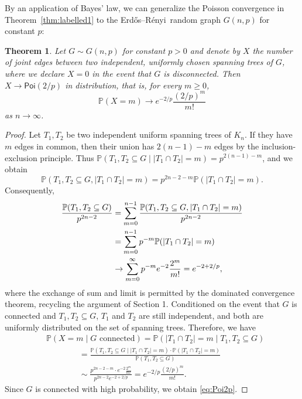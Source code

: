 \documentclass[a4paper,12pt,reqno]{amsart}
\newtheorem{theorem}[lemma]{Theorem}
\theoremstyle{remark}
\newcommand{\IP}{\mathbb{P}}
\newcommand{\Poi}{\mathsf{Poi}}
\newcommand{\ER}{Erd\H{o}s--R\'enyi\ }
\newcommand{\ssq}{\subseteq}
\begin{document}
By an application of Bayes' law, we can generalize the Poisson convergence in Theorem~\ref{thm:labelled1} to the \ER random graph $G(n,p)$ for constant $p$:
\begin{theorem}\label{thm:random}
 Let $G\sim G(n,p)$ for constant $p>0$ and denote by $X$ the number of joint edges between two independent, uniformly chosen spanning trees of $G$, where we declare $X=0$ in the event that $G$ is disconnected. Then $X\to \Poi(2/p)$ in distribution, that is, for every $m\geq 0$,
 \begin{equation}\label{eq:Poi2p}
  \IP(X=m) \to e^{-2/p} \frac{(2/p)^m}{m!}
 \end{equation}
 as $n\to\infty$.
\end{theorem}
\begin{proof}
Let $T_1,T_2$ be two independent uniform spanning trees of $K_n$. If they have $m$ edges in common, then their union has $2(n-1)-m$ edges by the inclusion-exclusion principle. Thus $\IP(T_1,T_2\ssq G\mid |T_1\cap T_2|=m) = p^{2(n-1)-m}$, and we obtain
\[
\IP(T_1,T_2\ssq G, |T_1\cap T_2|=m) = p^{2n-2-m} \IP (|T_1\cap T_2|=m).
\]
Consequently,
\begin{align}\label{eq:proofconstp}
 \frac{\IP(T_1,T_2\ssq G)}{p^{2n-2}}
 &= \sum_{m=0}^{n-1} \frac{\IP(T_1,T_2\ssq G, |T_1\cap T_2|=m)}{p^{2n-2}}\notag\\
 &= \sum_{m=0}^{n-1} p^{-m} \IP(|T_1\cap T_2|=m)\\
 &\to \sum_{m=0}^\infty  p^{-m}e^{-2} \frac{2^m}{m!} = e^{-2+2/p}\notag,
\end{align}
where the exchange of sum and limit is permitted by the dominated convergence theorem, recycling the argument of Section 1. Conditioned on the event that $G$ is connected and $T_1,T_2 \subseteq G$, $T_1$ and $T_2$ are still independent, and both are uniformly distributed on the set of spanning trees. Therefore, we have
\begin{align*}
 &\IP(X=m\mid G\text{ connected}) 
        = \IP( |T_1\cap T_2|=m \mid T_1,T_2\ssq G) \\
 &\qquad\qquad= \frac{\IP( T_1,T_2\ssq G \mid |T_1\cap T_2|=m) \cdot \IP(|T_1\cap T_2|=m)}{\IP(T_1,T_2\ssq G)}\\
 &\qquad\qquad\sim \frac{p^{2n-2-m}\cdot e^{-2}\frac{2^m}{m!}}{p^{2n-2}e^{-2+2/p}} = e^{-2/p}\frac{(2/p)^m}{m!}.
\end{align*}
Since $G$ is connected with high probability, we obtain \eqref{eq:Poi2p}. 
\end{proof}
\end{document}
